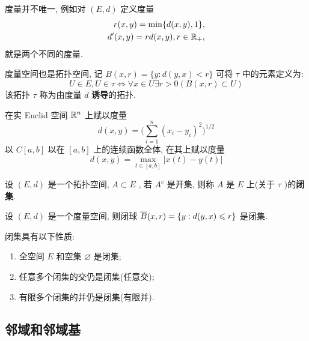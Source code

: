 \begin{Remark}\label{rmk:度量不唯一}
	度量并不唯一, 例如对 $ (E, d) $ 定义度量
	\begin{equation*}
		\begin{aligned}
			r(x, y) = \min\{ d(x, y), 1 \}, \\
			d'(x, y) = rd(x, y), r\in\R_{+},
		\end{aligned}
	\end{equation*}
	就是两个不同的度量.
\end{Remark}

度量空间也是拓扑空间, 记 $ B(x, r)=\{ y: d(y, x)<r \} $ 可将 $ \tau $ 中的元素定义为:
\[
	U\in E, U\in \tau\Leftrightarrow \forall x\in U\exists r>0(B(x, r)\subset U)
\]
该拓扑 $ \tau $ 称为由度量 $ d $ \textbf{诱导}的拓扑.

\begin{Example}
	在实 Euclid 空间 $ \R^{n} $ 上赋以度量
	\begin{equation}
		d(x, y)=\bigg( \sum_{i=1}^{n}(x_{i}-y_{i})^{2} \bigg)^{1/2}\tag{Euclid距离}
	\end{equation}
	以 $ C[a, b] $ 以在 $ [a, b] $ 上的连续函数全体, 在其上赋以度量
	\begin{equation}
		d(x, y) = \max_{t\in [a, b]} |x(t)-y(t)|\tag{一致距离}
	\end{equation}
\end{Example}

\begin{Definition}[闭集]\label{def:闭集}
	设 $ (E, d) $ 是一个拓扑空间, $ A\subset E $ , 若 $ A^{c} $ 是开集, 则称 $ A $ 是 $ E $ 上(关于 $ \tau $ )的\textbf{闭集}.
\end{Definition}
\begin{Example}
	设 $ (E, d) $ 是一个度量空间, 则闭球 $ \baro{B}(x, r)=\{ y: d(y, x)\leqslant r \} $ 是闭集.
\end{Example}
\begin{Proposition}\label{prop:闭集的性质}
	闭集具有以下性质:
	\begin{enumerate}[(1)]
		\item 全空间 $ E $ 和空集 $ \varnothing $ 是闭集;
		\item 任意多个闭集的交仍是闭集(任意交);
		\item 有限多个闭集的并仍是闭集(有限并).
	\end{enumerate}
\end{Proposition}

\subsection{邻域和邻域基}

